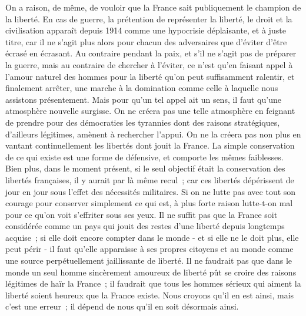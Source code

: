 \documentclass[french,twoside]{book} %
\begin{document}
On a raison, de même, de vouloir que la France sait publiquement le champion de la liberté. En cas de guerre, la prétention de représenter la liberté, le droit et la civilisation apparaît depuis 1914 comme une hypocrisie déplai­sante, et à juste titre, car il ne s'agit plus alors pour chacun des adversaires que d'éviter d'être écrasé en écrasant. Au contraire pendant la paix, et s'il ne s'agit pas de préparer la guerre, mais au contraire de chercher à l'éviter, ce n'est qu'en faisant appel à l'amour naturel des hommes pour la liberté qu'on peut suffisamment ralentir, et finalement arrêter, une marche à la domination comme celle à laquelle nous assistons présentement. Mais pour qu'un tel appel ait un sens, il faut qu'une atmosphère nouvelle surgisse. On ne créera pas une telle atmosphère en feignant de prendre pour des démocraties les tyrannies dont des raisons stratégiques, d'ailleurs légitimes, amènent à rechercher l'appui. On ne la créera pas non plus en vantant continuellement les libertés dont jouit la France. La simple conservation de ce qui existe est une forme de défensive, et comporte les mêmes faiblesses. Bien plus, dans le moment présent, si le seul objectif était la conservation des libertés françaises, il y aurait par là même recul ; car ces libertés dépérissent de jour en jour sous l'effet des nécessités militaires. Si on ne lutte pas avec tout son courage pour conserver simplement ce qui est, à plus forte raison lutte-t-on mal pour ce qu'on voit s'effriter sous ses yeux. Il ne suffit pas que la France soit considérée comme un pays qui jouit des restes d'une liberté depuis longtemps acquise ; si elle doit encore compter dans le monde - et si elle ne le doit plus, elle peut périr - il faut qu'elle apparaisse à ses propres citoyens et au monde comme une source perpétuellement jaillissante de liberté. Il ne faudrait pas que dans le monde un seul homme sincèrement amoureux de liberté pût se croire des raisons légitimes de haïr la France ; il faudrait que tous les hommes sérieux qui aiment la liberté soient heureux que la France existe. Nous croyons qu'il en est ainsi, mais c'est une erreur ; il dépend de nous qu'il en soit désormais ainsi.\par

\begin{center}
\end{center}
\end{document}
